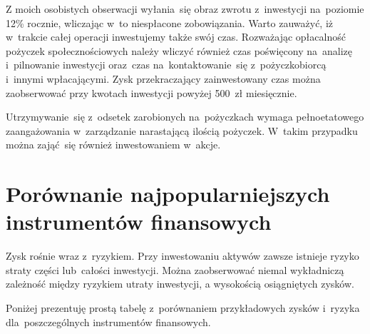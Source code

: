 \documentclass[a4paper,twoside,titlepage,openright]{book}
\begin{document}
Z moich osobistych obserwacji wyłania~się obraz zwrotu z~inwestycji na~poziomie 12\% rocznie, wliczając w~to niespłacone zobowiązania. Warto zauważyć, iż w~trakcie całej operacji inwestujemy także swój czas. Rozważając opłacalność pożyczek społecznościowych należy wliczyć również czas poświęcony na~analizę i~pilnowanie inwestycji oraz~czas na~kontaktowanie~się z~pożyczkobiorcą i~innymi wpłacającymi. Zysk przekraczający zainwestowany czas można zaobserwować przy kwotach inwestycji powyżej 500~zł miesięcznie. 

Utrzymywanie~się z~odsetek zarobionych na~pożyczkach wymaga pełnoetatowego zaangażowania w~zarządzanie narastającą ilością pożyczek. W~takim przypadku można zająć~się również inwestowaniem w~akcje.


\section{Porównanie najpopularniejszych instrumentów finansowych}


Zysk rośnie wraz z~ryzykiem. Przy inwestowaniu aktywów zawsze istnieje ryzyko straty części lub~całości inwestycji. Można zaobserwować niemal wykładniczą zależność między ryzykiem utraty inwestycji, a wysokością osiągniętych zysków. 

Poniżej prezentuję prostą tabelę z~porównaniem przykładowych zysków i~ryzyka dla~poszczególnych instrumentów finansowych. 

\begin{small}
\noindent
{}
\end{small}
\end{document}
